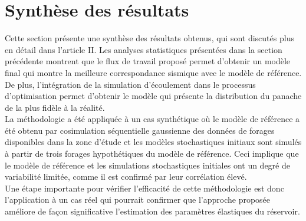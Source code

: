 \section{Synthèse des résultats}
Cette section présente une synthèse des résultats obtenus, qui sont discutés
plus
en détail dans l'article II.
Les analyses statistiques présentées dans la section précédente montrent que le
flux de travail proposé permet d'obtenir un modèle final qui montre la meilleure
correspondance
sismique avec le modèle de référence. De plus, l'intégration de la simulation
d'écoulement dans le processus d'optimisation permet d'obtenir le modèle qui
présente la distribution du panache de  la plus fidèle à la réalité. \\
La méthodologie a été appliquée à un cas synthétique où le modèle de référence a
été obtenu par cosimulation séquentielle gaussienne des données de forages
disponibles dans la zone d'étude et les modèles stochastiques initiaux sont
simulés à partir de trois forages hypothétiques du modèle de référence. Ceci
implique que le modèle de référence et les simulations stochastiques initiales
ont un degré de variabilité limitée, comme il est confirmé par leur corrélation
élevé.\\
Une étape importante pour vérifier l’efficacité de cette méthodologie est donc
l'application à un cas réel qui pourrait confirmer que l'approche proposée
améliore de façon significative l'estimation des paramètres élastiques du
réservoir.

